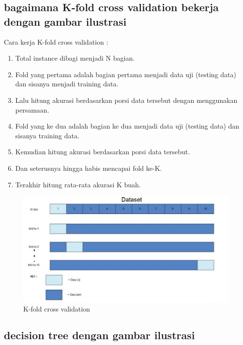 \subsection{bagaimana K-fold cross validation bekerja dengan gambar ilustrasi}

\par Cara kerja K-fold cross validation :
\begin{enumerate}
\item Total instance dibagi menjadi N bagian.
\item Fold yang pertama adalah bagian pertama menjadi data uji (testing data) dan sisanya menjadi training data.
\item Lalu hitung akurasi berdasarkan porsi data tersebut dengan menggunakan persamaan.
\item Fold yang ke dua adalah bagian ke dua menjadi data uji (testing data) dan sisanya training data. 
\item Kemudian hitung akurasi berdasarkan porsi data tersebut.
\item Dan seterusnya hingga habis mencapai fold ke-K.
\item Terakhir hitung rata-rata akurasi K buah.
\end{enumerate}

\begin{figure}[ht]
\centering
\includegraphics[scale=0.5]{figures/f5.jpg}
\caption{K-fold cross validation }
\label{contoh}
\end{figure}

\subsection{decision tree dengan gambar ilustrasi}

